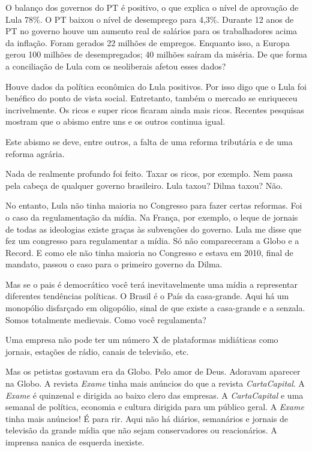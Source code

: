 \falaG O balanço dos governos do PT é positivo, o que explica o nível de
aprovação de Lula 78\%. O PT baixou o nível de desemprego para 4,3\%.
Durante 12 anos de PT no governo houve um aumento real de salários para
os trabalhadores acima da inflação. Foram gerados 22 milhões de
empregos. Enquanto isso, a Europa gerou 100 milhões de desempregados; 40
milhões saíram da miséria. De que forma a conciliação de Lula com os
neoliberais afetou esses dados?

\falaM Houve dados da política econômica do Lula positivos. Por isso digo
que o Lula foi benéfico do ponto de vista social. Entretanto, também o
mercado se enriqueceu incrivelmente. Os ricos e super ricos ficaram
ainda mais ricos. Recentes pesquisas mostram que o abismo entre uns e os
outros continua igual.

\falaG Este abismo se deve, entre outros, a falta de uma reforma tributária
e de uma reforma agrária.

\falaM Nada de realmente profundo foi feito. Taxar os ricos, por exemplo.
Nem passa pela cabeça de qualquer governo brasileiro. Lula taxou? Dilma
taxou? Não.

\falaG No entanto, Lula não tinha maioria no Congresso para fazer certas
reformas. Foi o caso da regulamentação da mídia. Na França, por exemplo,
o leque de jornais de todas as ideologias existe graças às subvenções do
governo. Lula me disse que fez um congresso para regulamentar a mídia.
Só não compareceram a Globo e a Record. E como ele não tinha maioria no
Congresso e estava em 2010, final de mandato, passou o caso para o
primeiro governo da Dilma.

\falaM Mas se o pais é democrático você terá inevitavelmente uma mídia a
representar diferentes tendências políticas. O Brasil é o País da
casa-grande. Aqui há um monopólio disfarçado em oligopólio, sinal de que
existe a casa-grande e a senzala. Somos totalmente medievais. Como você
regulamenta?

\falaG Uma empresa não pode ter um número X de plataformas midiáticas como
jornais, estações de rádio, canais de televisão, etc.

\falaM Mas os petistas gostavam era da Globo. Pelo amor de Deus. Adoravam
aparecer na Globo. A revista \emph{Exame} tinha mais anúncios do que a
revista \emph{CartaCapital}. A \emph{Exame} é quinzenal e dirigida ao
baixo clero das empresas. A \emph{CartaCapital} e uma semanal de
política, economia e cultura dirigida para um público geral. A
\emph{Exame} tinha mais anúncios! É para rir. Aqui não há diários,
semanários e jornais de televisão da grande mídia que não sejam
conservadores ou reacionários. A imprensa nanica de esquerda inexiste.

